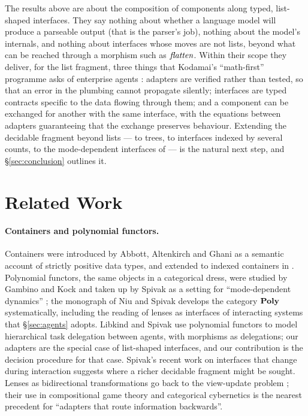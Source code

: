 \documentclass{fundam}
\begin{document}
The results above are about the composition of components along typed, list-shaped
interfaces.  They say nothing about whether a language model will produce a parseable
output (that is the parser's job), nothing about the model's internals, and nothing about
interfaces whose moves are not lists, beyond what can be reached through a morphism such
as $\mathit{flatten}$.  Within their scope they deliver, for the list fragment, three things
that Kodamai's ``math-first'' programme asks of enterprise agents
\cite{KodamaiEEJ26,KodamaiPR26}: adapters are verified rather than tested, so that an
error in the plumbing cannot propagate silently; interfaces are typed contracts specific
to the data flowing through them; and a component can be exchanged for another with the
same interface, with the equations between adapters guaranteeing that the exchange
preserves behaviour.  Extending the decidable fragment beyond lists --- to trees, to
interfaces indexed by several counts, to the mode-dependent interfaces of
\cite{Spivak26} --- is the natural next step, and \S\ref{sec:conclusion} outlines it.

\section{Related Work}\label{sec:related}

\paragraph{Containers and polynomial functors.}  Containers were introduced by Abbott,
Altenkirch and Ghani \cite{Abbott03,AbbottAltenkirchGhani03,AbbottAltenkirchGhani05} as a
semantic account of strictly positive data types, and extended to indexed containers in
\cite{AltenkirchGhaniHancockMcBrideMorris15}.  Polynomial functors, the same objects in a
categorical dress, were studied by Gambino and Kock \cite{GambinoKock13} and taken up by
Spivak as a setting for ``mode-dependent dynamics'' \cite{Spivak20}; the monograph of Niu
and Spivak \cite{NiuSpivak25} develops the category $\mathbf{Poly}$ systematically, including the
reading of lenses as interfaces of interacting systems that \S\ref{sec:agents} adopts.
Libkind and Spivak \cite{LibkindSpivak24} use polynomial functors to model hierarchical
task delegation between agents, with morphisms as delegations; our adapters are the
special case of list-shaped interfaces, and our contribution is the decision procedure
for that case.  Spivak's recent work on interfaces that change during interaction
\cite{Spivak26} suggests where a richer decidable fragment might be sought.  Lenses as
bidirectional transformations go back to the view-update problem \cite{FosterEtAl07};
their use in compositional game theory \cite{GhaniHedgesWinschelZahn18} and categorical cybernetics
\cite{CapucciGavranovicHedgesRischel22} is the nearest precedent for ``adapters that route
information backwards''.
\end{document}
